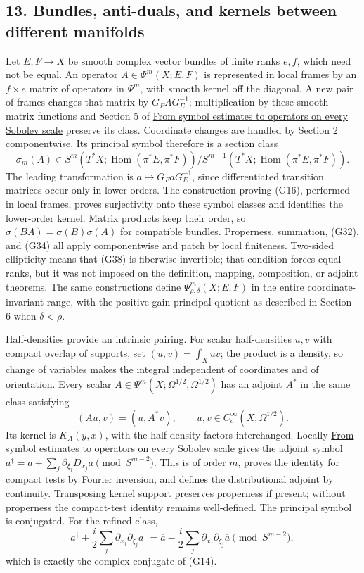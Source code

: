 \documentclass[
  11pt,
]{article}
\begin{document}
\subsection{13. Bundles, anti-duals, and kernels between different
manifolds}\label{bundles-anti-duals-and-kernels-between-different-manifolds}

Let \(E,F\to X\) be smooth complex vector bundles of finite ranks
\(e,f\), which need not be equal. An operator \(A\in\Psi^m(X;E,F)\) is
represented in local frames by an \(f\times e\) matrix of operators in
\(\Psi^m\), with smooth kernel off the diagonal. A new pair of frames
changes that matrix by \(G_F A G_E^{-1}\); multiplication by these
smooth matrix functions and Section 5 of
\href{euclidean-symbol-calculus.pdf}{From symbol estimates to operators
on every Sobolev scale} preserve its class. Coordinate changes are
handled by Section 2 componentwise. Its principal symbol therefore is a
section class \[
\sigma_m(A)\in
S^m(T^*X;\operatorname{Hom}(\pi^*E,\pi^*F))
\big/S^{m-1}(T^*X;\operatorname{Hom}(\pi^*E,\pi^*F)).
\tag{G38}
\] The leading transformation is \(a\mapsto G_FaG_E^{-1}\), since
differentiated transition matrices occur only in lower orders. The
construction proving (G16), performed in local frames, proves
surjectivity onto these symbol classes and identifies the lower-order
kernel. Matrix products keep their order, so
\(\sigma(BA)=\sigma(B)\sigma(A)\) for compatible bundles. Properness,
summation, (G32), and (G34) all apply componentwise and patch by local
finiteness. Two-sided ellipticity means that (G38) is fiberwise
invertible; that condition forces equal ranks, but it was not imposed on
the definition, mapping, composition, or adjoint theorems. The same
constructions define \(\Psi^m_{\rho,\delta}(X;E,F)\) in the entire
coordinate-invariant range, with the positive-gain principal quotient as
described in Section 6 when \(\delta<\rho\).

Half-densities provide an intrinsic pairing. For scalar half-densities
\(u,v\) with compact overlap of supports, set
\((u,v)=\int_Xu\overline v\); the product is a density, so change of
variables makes the integral independent of coordinates and of
orientation. Every scalar \(A\in\Psi^m(X;\Omega^{1/2},\Omega^{1/2})\)
has an adjoint \(A^*\) in the same class satisfying \[
(Au,v)=(u,A^*v),\qquad u,v\in C_c^\infty(X;\Omega^{1/2}).
\tag{G39}
\] Its kernel is \(\overline{K_A(y,x)}\), with the half-density factors
interchanged. Locally \href{euclidean-symbol-calculus.pdf}{From symbol
estimates to operators on every Sobolev scale} gives the adjoint symbol
\(a^\dagger=\overline a+\sum_j\partial_{\xi_j}D_{x_j}\overline a\pmod {S^{m-2}}\).
This is of order \(m\), proves the identity for compact tests by Fourier
inversion, and defines the distributional adjoint by continuity.
Transposing kernel support preserves properness if present; without
properness the compact-test identity remains well-defined. The principal
symbol is conjugated. For the refined class, \[
a^\dagger+\frac i2\sum_j\partial_{x_j}\partial_{\xi_j}a^\dagger
=\overline a-\frac i2\sum_j\partial_{x_j}\partial_{\xi_j}\overline a
\pmod {S^{m-2}},
\tag{G40}
\] which is exactly the complex conjugate of (G14).
\end{document}
